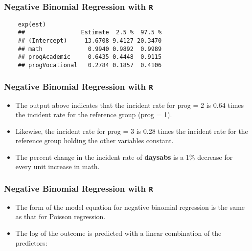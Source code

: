 \documentclass[MASTER.tex]{subfiles}
\begin{document}
\begin{frame}[fragile]
	\frametitle{Negative Binomial Regression with \texttt{R} }
	\large
	\begin{verbatim}	
	exp(est)
	##                Estimate  2.5 %  97.5 %
	## (Intercept)     13.6708 9.4127 20.3470
	## math             0.9940 0.9892  0.9989
	## progAcademic     0.6435 0.4448  0.9115
	## progVocational   0.2784 0.1857  0.4106
	\end{verbatim}
\end{frame}
\begin{frame}[fragile]
	\frametitle{Negative Binomial Regression with \texttt{R} }
	\Large
	\begin{itemize}
\item 	The output above indicates that the incident rate for prog = 2 is 0.64 times the incident rate for the reference group (prog = 1). 
\item Likewise, the incident rate for prog = 3 is 0.28 times the incident rate for the reference group holding the other variables constant. 
\item The percent change in the incident rate of \textbf{daysabs} is a 1\% decrease for every unit increase in math.
\end{itemize}
\end{frame}
\begin{frame}[fragile]
	\frametitle{Negative Binomial Regression with \texttt{R} }
	\Large
	\begin{itemize}
\item 	The form of the model equation for negative binomial regression is the same as that for Poisson regression. 
\item 	The log of the outcome is predicted with a linear combination of the predictors:
\end{itemize}
\end{frame}
\end{document}
